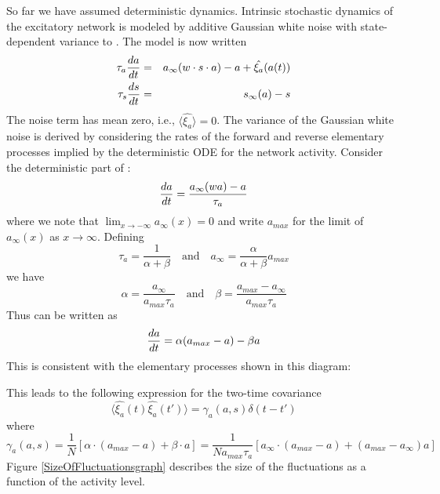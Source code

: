 \documentclass[12pt]{article}
\def\w{w}
\def\taua{\tau_a}
\def\taus{\tau_s}
\def\ainf{a_\infty}
\def\sinf{s_\infty}
\def\xia{\xi_a}
\def\amax{a_{max}}
\begin{document}
So far we have assumed deterministic dynamics.  Intrinsic stochastic dynamics of the excitatory network is modeled by additive Gaussian white noise with state-dependent variance to . The model is now written
\begin{eqnarray}
\tau_a \ddt{a} &=& \ainf (\w \cdot s \cdot a) - a + \hat{\xia}(a(t)) \label{ODEAnoise} \\
\taus \ddt{s} &=& \sinf (a) - s  \label{ODESnoise} 
\end{eqnarray}
The noise term has mean zero, i.e., $\langle \hat{\xia} \rangle = 0$.  The variance of the Gaussian white noise is derived by considering the rates of the forward and reverse  elementary processes
implied by the deterministic ODE for the network activity. Consider the deterministic part of :
\begin{equation*}
 \ddt{a} = \dfrac{ \ainf(wa) - a }{\taua} 
\end{equation*}
where we 
note that $\lim_{x \rightarrow -\infty} \ainf(x)=0$ and
write $\amax$ for the limit of $\ainf(x)$ as $x \rightarrow \infty$.  Defining 
\begin{equation*}
\taua = \frac{1}{\alpha+\beta } \quad \mbox{and} \quad \ainf = \dfrac{\alpha}{\alpha+\beta} \amax  
\end{equation*}
we have 
\begin{equation*}
\alpha  = \frac{\ainf}{\amax \taua } \quad \mbox{and} \quad \beta = \dfrac{\amax - \ainf}{\amax \taua}   
\end{equation*}
Thus  can be written as 
\begin{equation*}
 \ddt{a} = \alpha (\amax - a) - \beta a  
\end{equation*}
This is consistent with the elementary processes shown in this diagram:
\begin{center}
\end{center}
This leads to the following expression for the two-time covariance 
\[
\langle \hat{\xia} (t) \hat{\xia} (t')  \rangle = \gamma_a (a,s) \delta (t - t')
\]
where 
\begin{equation}
  \gamma_a (a,s) = \frac{1}{N} \left[  \alpha \cdot (\amax-a) + \beta \cdot a \right] = 
  \frac{1}{N \amax \taua } \left[  \ainf \cdot (\amax-a) + (\amax - \ainf)  a \right] \label{SizeOfFluctuations}
\end{equation}
Figure \ref{SizeOfFluctuationsgraph} describes the size of the fluctuations as a function of the activity level.
\end{document}
